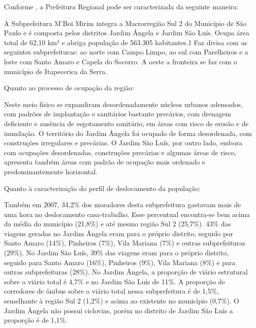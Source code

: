 	Conforme , a Prefeitura Regional pode ser caracterizada da seguinte maneira:
	
	\begin{citacao}
		A Subprefeitura M’Boi Mirim integra a Macrorregião Sul 2 do Município de São Paulo e é composta pelos distritos Jardim Ângela e Jardim São Luís. Ocupa área total de 62,10 km² e abriga população de 563.305 habitantes.1 Faz divisa com as seguintes subprefeituras: ao norte com Campo Limpo, ao sul com Parelheiros e a leste com Santo Amaro e Capela do Socorro. A oeste a fronteira se faz com o município de Itapecerica da Serra.
	\end{citacao}
	
	Quanto ao processo de ocupação da região:
	
	\begin{citacao}
		Neste meio físico se expandiram desordenadamente núcleos urbanos adensados, com padrões de implantação e sanitários bastante precários, com drenagem deficiente e ausência de esgotamento sanitário, em áreas com risco de erosão e de inundação. O território do Jardim Ângela foi ocupado de forma desordenada, com construções irregulares e precárias. O Jardim São Luís, por outro lado, embora com ocupações desordenadas, construções precárias e algumas áreas de risco, apresenta também áreas com padrão de ocupação mais ordenado e predominantemente horizontal. \cite[pág. 147]{planosul2}
	\end{citacao}
	
	Quanto à caracterização do perfil de deslocamento da população:
	
	\begin{citacao}
		Também em 2007, 34,2\% dos moradores desta subprefeitura gastavam mais de uma hora no deslocamento casa-trabalho. Esse percentual encontra-se bem acima da média do município (21,8\%) e até mesmo região Sul 2 (25,7\%). 43\% das viagens geradas no Jardim Ângela eram para o próprio distrito, seguido por Santo Amaro (14\%), Pinheiros (7\%), Vila Mariana (7\%) e outras subprefeituras (29\%). No Jardim São Luís, 39\% das viagens eram para o próprio distrito, seguido para Santo Amaro (16\%), Pinheiros (9\%), Vila Mariana (8\%) e para outras subprefeituras (28\%). No Jardim Ângela, a proporção de viário estrutural sobre o viário total é 4,7\% e no Jardim São Luís de 11\%. A proporção de corredores de ônibus sobre o viário total nessa subprefeitura é de 1,5\%, semelhante à região Sul 2 (1,2\%) e acima ao existente no município (0,7\%). O Jardim Ângela não possui ciclovias, porém no distrito de Jardim São Luís a proporção é de 1,1\%. \cite[pág. 147]{planosul2}
	\end{citacao}
	
